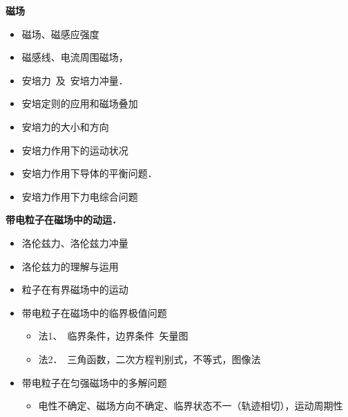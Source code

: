 \textbf{磁场}
\begin{itemize}
\item 磁场、磁感应强度
\item 磁感线、电流周围磁场，
\item 安培力\ 及\ 安培力冲量．
\item 安培定则的应用和磁场叠加
\item 安培力的大小和方向
\item 安培力作用下的运动状况
\item 安培力作用下导体的平衡问题．
\item 安培力作用下力电综合问题
\end{itemize}
\textbf{带电粒子在磁场中的动运．}
\begin{itemize}
\item 洛伦兹力、洛伦兹力冲量
\item 洛伦兹力的理解与运用
\item 粒子在有界磁场中的运动
\item 带电粒子在磁场中的临界极值问题
  \begin{itemize}
  \item 法1、\ 临界条件，边界条件\ 矢量图
  \item 法2．\ 三角函数，二次方程判别式，不等式，图像法
  \end{itemize}
\item 带电粒子在匀强磁场中的多解问题
  \begin{itemize}
  \item 电性不确定、磁场方向不确定、临界状态不一（轨迹相切），运动周期性
  \end{itemize}
\end{itemize}
